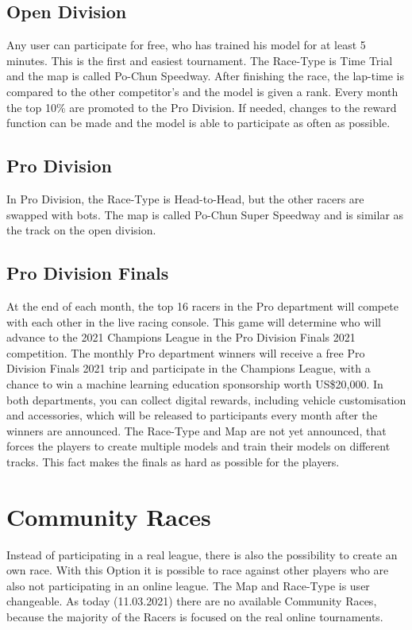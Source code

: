 \subsection{Open Division}
Any user can participate for free, who has trained his model for at least 5 minutes. This is the first and easiest tournament. The Race-Type is Time Trial and the map is called Po-Chun Speedway. After finishing the race, the lap-time is compared to the other competitor's and the model is given a rank. Every month the top 10\% are promoted to the Pro Division. If needed, changes to the reward function can be made and the model is able to participate as often as possible. 

\subsection{Pro Division}
In Pro Division, the Race-Type is Head-to-Head, but the other racers are swapped with bots. The map is called Po-Chun Super Speedway and is similar as the track on the open division. 


\subsection{Pro Division Finals}
At the end of each month, the top 16 racers in the Pro department will compete with each other in the live racing console. This game will determine who will advance to the 2021 Champions League in the Pro Division Finals 2021 competition. The monthly Pro department winners will receive a free Pro Division Finals 2021 trip and participate in the Champions League, with a chance to win a machine learning education sponsorship worth US\$20,000. In both departments, you can collect digital rewards, including vehicle customisation and accessories, which will be released to participants every month after the winners are announced.
The Race-Type and Map are not yet announced, that forces the players to create multiple models and train their models on different tracks. This fact makes the finals as hard as possible for the players.  

\section{Community Races}
Instead of participating in a real league, there is also the possibility to create an own race. With this Option it is possible to race against other players who are also not participating in an online league. The Map and Race-Type is user changeable. As today (11.03.2021) there are no available Community Races, because the majority of the Racers is focused on the real online tournaments.

